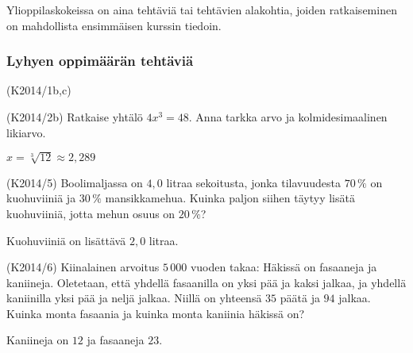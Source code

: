 Ylioppilaskokeissa on aina tehtäviä tai tehtävien alakohtia, joiden ratkaiseminen on mahdollista ensimmäisen kurssin tiedoin.


\subsubsection*{Lyhyen oppimäärän tehtäviä}

\begin{tehtava} (K2014/1b,c) 
    \begin{vastaus}
    \end{vastaus}	
\end{tehtava}

\begin{tehtava}(K2014/2b)
Ratkaise yhtälö $4x^3=48$. Anna tarkka arvo ja kolmidesimaalinen likiarvo.
    \begin{vastaus}

$x=\sqrt[3]{12}\approx2,289$

    \end{vastaus}	
\end{tehtava}

\begin{tehtava} (K2014/5) Boolimaljassa on $4,0$ litraa sekoitusta, jonka tilavuudesta $70\,\%$ on kuohuviiniä ja $30\,\%$ mansikkamehua. Kuinka paljon siihen täytyy lisätä kuohuviiniä, jotta mehun osuus on $20\,\%$?
    \begin{vastaus}
	    Kuohuviiniä on lisättävä $2,0$ litraa.
    \end{vastaus}
\end{tehtava}

\begin{tehtava} (K2014/6) Kiinalainen arvoitus $5\,000$ vuoden takaa: Häkissä on fasaaneja ja kaniineja. Oletetaan, että yhdellä fasaanilla on yksi pää ja kaksi jalkaa, ja yhdellä kaniinilla yksi pää ja neljä jalkaa. Niillä on yhteensä $35$ päätä ja $94$ jalkaa. Kuinka monta fasaania ja kuinka monta kaniinia häkissä on?
	\begin{vastaus}
		Kaniineja on $12$ ja fasaaneja $23$.
	\end{vastaus}
\end{tehtava}

